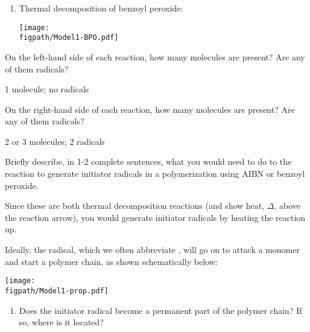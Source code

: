 \begin{activity}
\begin{model}[Initiation]
\begin{enumerate}
		\item Thermal decomposition of benzoyl peroxide:
	
			\centerline{\texttt{[image: \\figpath/Model1-BPO.pdf]}}
			
	\end{enumerate}
	
	
\end{model}


\begin{ctqs}

	\question On the left-hand side of each reaction, how many molecules are present?  Are any of them radicals?
	
		\begin{solution}[0.5in]
		
			1 molecule; no radicals
			
		\end{solution}
	
	\question On the right-hand side of each reaction, how many molecules are present? Are any of them radicals?
	
		\begin{solution}[0.5in]
		
			2 or 3 molecules; 2 radicals
			
		\end{solution}
	
	\question Briefly describe, in 1-2 complete sentences, what you would need to do to the reaction to generate initiator radicals in a polymerization using AIBN or benzoyl peroxide.
	
		\begin{solution}[1.5in]
			Since these are both thermal decomposition reactions (and show heat, $\Delta$, above the reaction arrow), you would generate initiator radicals by heating the reaction up.
		\end{solution}
		
	\question Ideally, the radical, which we often abbreviate , will go on to attack a monomer and start a polymer chain, as shown schematically below:
	
			\centerline{\texttt{[image: \\figpath/Model1-prop.pdf]}}
	
		\begin{enumerate}
			\item Does the initiator radical become a permanent part of the polymer chain?  If so, where is it located?
	

\end{enumerate}
\end{ctqs}
\end{activity}
